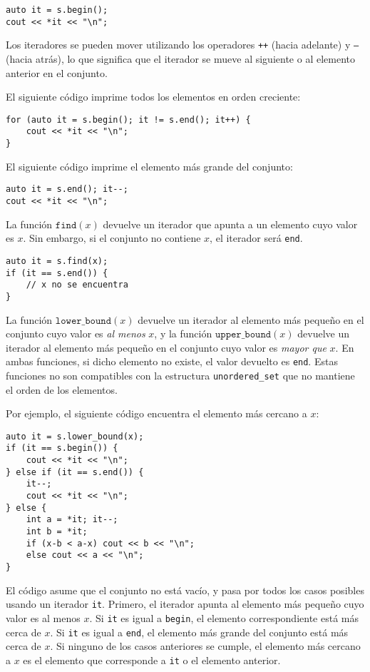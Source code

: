 \begin{lstlisting}
auto it = s.begin();
cout << *it << "\n";
\end{lstlisting}

Los iteradores se pueden mover utilizando los operadores
\texttt{++} (hacia adelante) y \texttt{--} (hacia atrás),
lo que significa que el iterador se mueve al siguiente
o al elemento anterior en el conjunto.

El siguiente código imprime todos los elementos
en orden creciente:
\begin{lstlisting}
for (auto it = s.begin(); it != s.end(); it++) {
    cout << *it << "\n";
}
\end{lstlisting}
El siguiente código imprime el elemento más grande del conjunto:
\begin{lstlisting}
auto it = s.end(); it--;
cout << *it << "\n";
\end{lstlisting}

La función $\texttt{find}(x)$ devuelve un iterador
que apunta a un elemento cuyo valor es $x$.
Sin embargo, si el conjunto no contiene $x$,
el iterador será \texttt{end}.

\begin{lstlisting}
auto it = s.find(x);
if (it == s.end()) {
    // x no se encuentra
}
\end{lstlisting}

La función $\texttt{lower\_bound}(x)$ devuelve
un iterador al elemento más pequeño en el conjunto
cuyo valor es \emph{al menos} $x$, y
la función $\texttt{upper\_bound}(x)$
devuelve un iterador al elemento más pequeño en el conjunto
cuyo valor es \emph{mayor que} $x$.
En ambas funciones, si dicho elemento no existe,
el valor devuelto es \texttt{end}.
Estas funciones no son compatibles con la
estructura \texttt{unordered\_set} que
no mantiene el orden de los elementos.

\begin{samepage}
Por ejemplo, el siguiente código encuentra el elemento
más cercano a $x$:

\begin{lstlisting}
auto it = s.lower_bound(x);
if (it == s.begin()) {
    cout << *it << "\n";
} else if (it == s.end()) {
    it--;
    cout << *it << "\n";
} else {
    int a = *it; it--;
    int b = *it;
    if (x-b < a-x) cout << b << "\n";
    else cout << a << "\n";
}
\end{lstlisting}

El código asume que el conjunto no está vacío,
y pasa por todos los casos posibles
usando un iterador \texttt{it}.
Primero, el iterador apunta al elemento más pequeño
cuyo valor es al menos $x$.
Si \texttt{it} es igual a \texttt{begin},
el elemento correspondiente está más cerca de $x$.
Si \texttt{it} es igual a \texttt{end},
el elemento más grande del conjunto está más cerca de $x$.
Si ninguno de los casos anteriores se cumple,
el elemento más cercano a $x$ es el
elemento que corresponde a \texttt{it} o el elemento anterior.
\end{samepage}

